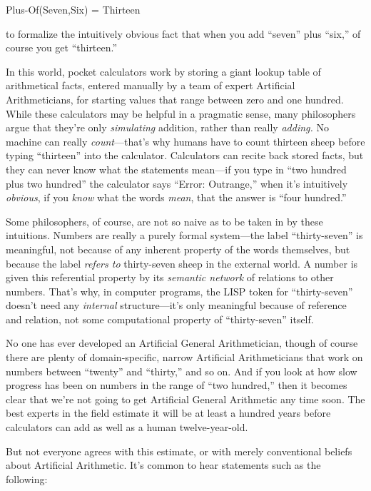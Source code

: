 {\centering
 Plus-Of(Seven,Six) = Thirteen
\par}


\bigskip

{
 to formalize the intuitively obvious fact that when you add
``seven'' plus
``six,'' of course you get
``thirteen.'' }

{
 In this world, pocket calculators work by storing a giant lookup
table of arithmetical facts, entered manually by a team of expert
Artificial Arithmeticians, for starting values that range between zero
and one hundred. While these calculators may be helpful in a pragmatic
sense, many philosophers argue that they're only
\textit{simulating} addition, rather than really \textit{adding.} No
machine can really \textit{count}{}---that's why humans
have to count thirteen sheep before typing
``thirteen'' into the calculator.
Calculators can recite back stored facts, but they can never know what
the statements mean---if you type in ``two hundred
plus two hundred'' the calculator says
``Error: Outrange,'' when
it's intuitively \textit{obvious}, if you \textit{know}
what the words \textit{mean}, that the answer is
``four hundred.''}

{
 Some philosophers, of course, are not so naive as to be taken in
by these intuitions. Numbers are really a purely formal system---the
label ``thirty-seven'' is
meaningful, not because of any inherent property of the words
themselves, but because the label \textit{refers to} thirty-seven sheep
in the external world. A number is given this referential property by
its \textit{semantic network} of relations to other numbers.
That's why, in computer programs, the LISP token for
``thirty-seven''
doesn't need any \textit{internal}
structure---it's only meaningful because of reference
and relation, not some computational property of
``thirty-seven'' itself.}

{
 No one has ever developed an Artificial General Arithmetician,
though of course there are plenty of domain-specific, narrow Artificial
Arithmeticians that work on numbers between
``twenty'' and
``thirty,'' and so on. And if you
look at how slow progress has been on numbers in the range of
``two hundred,'' then it becomes
clear that we're not going to get Artificial General
Arithmetic any time soon. The best experts in the field estimate it
will be at least a hundred years before calculators can add as well as
a human twelve-year-old.}

{
 But not everyone agrees with this estimate, or with merely
conventional beliefs about Artificial Arithmetic. It's
common to hear statements such as the following:}

